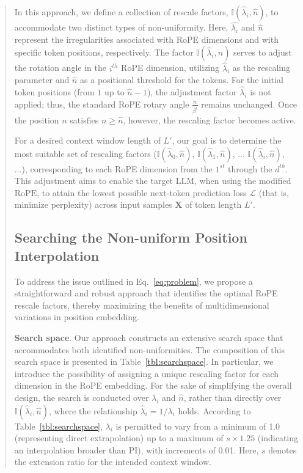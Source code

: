 \begin{abstract}
In this approach, we define a collection of rescale factors, $\mathbb{I}(\hat{\lambda}_{i},\hat{n})$, to accommodate two distinct types of non-uniformity. Here, $\hat{\lambda_i}$ and $\hat{n}$ represent the irregularities associated with RoPE dimensions and with specific token positions, respectively. The factor $\mathbb{I}(\hat{\lambda}_{i},\hat{n})$ serves to adjust the rotation angle in the $i^{th}$ RoPE dimension, utilizing $\hat\lambda_{i}$ as the rescaling parameter and $\hat{n}$ as a positional threshold for the tokens. For the initial token positions (from $1$ up to $\hat{n}-1$), the adjustment factor $\hat\lambda_{i}$ is not applied; thus, the standard RoPE rotary angle $\frac{n}{\beta^i}$ remains unchanged. Once the position $n$ satisfies $n \ge \hat{n}$, however, the rescaling factor becomes active.

For a desired context window length of $L'$, our goal is to determine the most suitable set of rescaling factors ($\mathbb{I}(\hat{\lambda}_{0},\hat{n})$, $\mathbb{I}(\hat{\lambda}_{1},\hat{n})$, ... $\mathbb{I}(\hat{\lambda}_{i},\hat{n})$, ...), corresponding to each RoPE dimension from the $1^{st}$ through the $d^{th}$. This adjustment aims to enable the target $\text{LLM}$, when using the modified $\text{RoPE}$, to attain the lowest possible next-token prediction loss $\mathcal{L}$ (that is, minimize perplexity) across input samples $\mathbf{X}$ of token length $L'$.

\subsection{Searching the Non-uniform Position Interpolation}

To address the issue outlined in Eq.~\ref{eq:problem}, we propose a straightforward and robust approach that identifies the optimal RoPE rescale factors, thereby maximizing the benefits of multidimensional variations in position embedding.

\textbf{Search space}. Our approach constructs an extensive search space that accommodates both identified non-uniformities. The composition of this search space is presented in Table~\ref{tbl:searchspace}. In particular, we introduce the possibility of assigning a unique rescaling factor for each dimension in the RoPE embedding. For the sake of simplifying the overall design, the search is conducted over $\lambda_i$ and $\hat{n}$, rather than directly over $\mathbb{I}(\hat{\lambda}_{i},\hat{n})$, where the relationship $\hat{\lambda}_{i}=1/\lambda_i$ holds. According to Table~\ref{tbl:searchspace}, $\lambda_i$ is permitted to vary from a minimum of 1.0 (representing direct extrapolation) up to a maximum of $s\times1.25$ (indicating an interpolation broader than PI), with increments of 0.01. Here, $s$ denotes the extension ratio for the intended context window.


\end{abstract}
